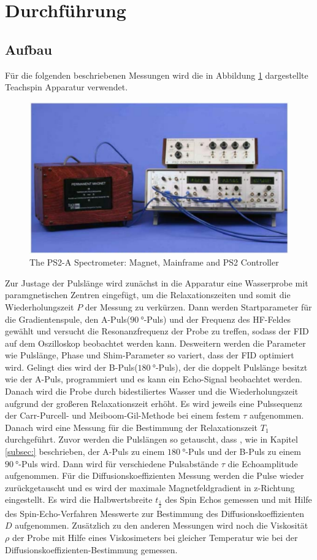 \section{Durchführung}
\label{sec:Durchführung}
\subsection{Aufbau}
Für die folgenden beschriebenen
Messungen wird die in Abbildung \ref{fig:teachspin}
dargestellte Teachspin Apparatur verwendet.
\begin{figure}
  \includegraphics{teachspin.PNG}
  \caption{The PS2-A Spectrometer: Magnet, Mainframe and PS2 Controller}
  \label{fig:teachspin}
\end{figure}
Zur Justage der Pulslänge wird zunächst
in die Apparatur eine Wasserprobe
mit paramgnetischen Zentren eingefügt, um
die Relaxationszeiten und somit die Wiederholungszeit $P$ der Messung zu verkürzen.
Dann werden Startparameter
für die Gradientenspule,
den A-Puls($\SI{90}{\degree}$-Puls)
und der Frequenz des HF-Feldes gewählt
und versucht die Resonanzfrequenz der Probe
zu treffen, sodass der FID auf dem Oszilloskop beobachtet werden kann. Desweitern werden die
Parameter wie Pulslänge, Phase und Shim-Parameter so variert, dass
der FID optimiert wird.
Gelingt dies wird der B-Puls($\SI{180}{\degree}$-Puls),
der die doppelt Pulslänge besitzt wie der A-Puls,
programmiert und es kann ein Echo-Signal beobachtet werden.
Danach wird die Probe durch bidestiliertes Wasser
und die Wiederholungszeit aufgrund der großeren Relaxationszeit
erhöht. Es wird jeweils eine Pulssequenz der Carr-Purcell-
und Meiboom-Gil-Methode bei einem festem $\tau$ aufgenommen.
Danach wird eine Messung für die Bestimmung der Relaxationszeit $T_1$
durchgeführt. Zuvor werden die Pulslängen so getauscht, dass , wie in Kapitel \ref{subsec:}
beschrieben, der A-Puls zu einem $\SI{180}{\degree}$-Puls
und der B-Puls zu einem $\SI{90}{\degree}$-Puls wird.
Dann wird für verschiedene Pulsabstände $\tau$ die Echoamplitude aufgenommen.
Für die Diffusionskoeffizienten Messung
werden die Pulse wieder zurückgetauscht
und es wird der maximale Magnetfeldgradient
in z-Richtung eingestellt. Es wird die Halbwertsbreite $t_{\tfrac{1}{2}}$
des Spin Echos gemessen und mit Hilfe
des Spin-Echo-Verfahren Messwerte zur Bestimmung
des Diffusionskoeffizienten $D$ aufgenommen.
Zusätzlich zu den anderen Messungen
wird noch die Viskosität $\rho$
der Probe mit Hilfe eines Viskosimeters
bei gleicher Temperatur wie bei der
Diffusionskoeffizienten-Bestimmung gemessen.
